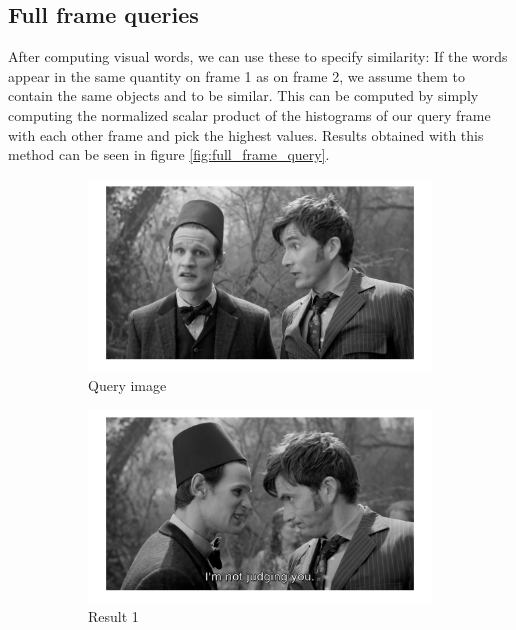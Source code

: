 \documentclass{paper}
\begin{document}
\subsection{Full frame queries}
After computing visual words, we can use these to specify similarity: If the words appear
in the same quantity on frame 1 as on frame 2, we assume them to contain the same objects
and to be similar. This can be computed by simply computing the normalized
 scalar product of the histograms of our 
query frame with each other frame and pick the highest values. Results obtained with this
method can be seen in figure \ref{fig:full_frame_query}. 
\begin{figure}
  \centering
  \begin{subfigure}[b]{0.32\textwidth}
    \includegraphics[width=\textwidth]{full_frame_query_img}
    \caption{Query image}
  \end{subfigure}
  \begin{subfigure}[b]{0.32\textwidth}
  	\includegraphics[width=\textwidth]{full_frame_query_result1}
  	\caption{Result 1}
  \end{subfigure}
  \begin{subfigure}[b]{0.32\textwidth}

\end{subfigure}
\end{figure}
\end{document}
